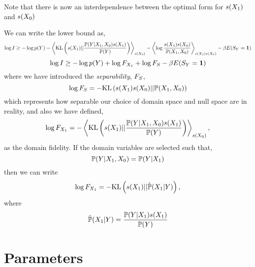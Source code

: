 \documentclass[]{article}
\begin{document}
Note that there is now an interdependence between the optimal form for $s({X_1})$ and $s({X_0})$

We can write the lower bound as,
$$
\log I \geq -\log p(Y) - \left\langle \text{KL}\left(s({X_1}) || \frac{\mathbb{P}(Y | {X_1},{X_0})s({X_1})}{\mathbb{P}(Y)}\right) \right\rangle_{s({X_0})}  - \left\langle \log \frac{s({X_1})s({X_0})}{\mathbb{P}({X_1},{X_0})} \right\rangle_{s({X_1})s({X_0})}  -\beta E(S_Y=\textbf{1})
$$
$$
\log I \geq -\log p(Y) + \log F_{X_1}  + \log {F_S}  -\beta E(S_Y=\textbf{1})
$$
where we have introduced the \emph{separability}, ${F_S}$,
$$
\log {F_S} = - \text{KL}\left(s({X_1})s({X_0})||\mathbb{P}({X_1},{X_0})\right)
$$
which represents how separable our choice of domain space and null space are in reality,
and also we have defined,
$$
\log F_{X_1} = - \left\langle \text{KL}\left(s({X_1}) || \frac{\mathbb{P}(Y | {X_1},{X_0})s({X_1})}{\mathbb{P}(Y)}\right) \right\rangle_{s({X_0})},
$$
as the domain fidelity. If the domain variables are selected such that,
$$
\mathbb{P}(Y | {X_1}, {X_0}) = \mathbb{P}(Y |{X_1})
$$
then we can write
$$
\log F_{X_1} = - \text{KL}\left(s({X_1}) || \hat{\mathbb{P}}({X_1} | Y) \right),
$$
where
$$
\hat{\mathbb{P}}({X_1} | Y) = \frac{\mathbb{P}(Y | {X_1})s({X_1})}{\mathbb{P}(Y)}
$$

\section{Parameters}
\end{document}
